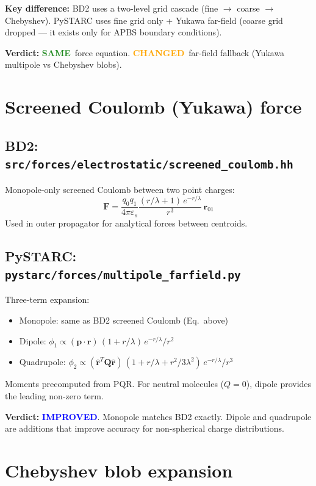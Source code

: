 \documentclass[11pt]{article}
\newcommand{\same}{\textcolor{ForestGreen}{\textbf{SAME}}}
\newcommand{\improved}{\textcolor{Blue}{\textbf{IMPROVED}}}
\newcommand{\changed}{\textcolor{Orange}{\textbf{CHANGED}}}
\begin{document}
\textbf{Key difference:} BD2 uses a two-level grid cascade (fine $\to$ coarse $\to$ Chebyshev).
PySTARC uses fine grid only + Yukawa far-field (coarse grid dropped --- it exists only for APBS boundary conditions).

\textbf{Verdict:} \same\ force equation. \changed\ far-field fallback
(Yukawa multipole vs Chebyshev blobs).


\section{Screened Coulomb (Yukawa) force}

\subsection{BD2: \texttt{src/forces/electrostatic/screened\_coulomb.hh}}
Monopole-only screened Coulomb between two point charges:
\begin{equation}
\mathbf{F} = \frac{q_0 q_1}{4\pi\varepsilon_s}
\frac{(r/\lambda + 1)\,e^{-r/\lambda}}{r^3}\,\mathbf{r}_{01}
\end{equation}
Used in outer propagator for analytical forces between centroids.

\subsection{PySTARC: \texttt{pystarc/forces/multipole\_farfield.py}}
Three-term expansion:
\begin{itemize}
\item Monopole: same as BD2 screened Coulomb (Eq.\ above)
\item Dipole: $\phi_1 \propto (\mathbf{p}\cdot\hat{\mathbf{r}})\,(1+r/\lambda)\,e^{-r/\lambda}/r^2$
\item Quadrupole: $\phi_2 \propto (\hat{\mathbf{r}}^T\mathbf{Q}\hat{\mathbf{r}})\,(1+r/\lambda+r^2/3\lambda^2)\,e^{-r/\lambda}/r^3$
\end{itemize}
Moments precomputed from PQR. For neutral molecules ($Q=0$),
dipole provides the leading non-zero term.

\textbf{Verdict:} \improved. Monopole matches BD2 exactly. Dipole and quadrupole
are additions that improve accuracy for non-spherical charge distributions.


\section{Chebyshev blob expansion}
\label{sec:farfield}
\end{document}
